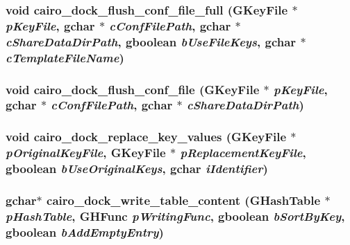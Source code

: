\subsubsection{\setlength{\rightskip}{0pt plus 5cm}void cairo\_\-dock\_\-flush\_\-conf\_\-file\_\-full (GKeyFile $\ast$ {\em pKeyFile}, gchar $\ast$ {\em cConfFilePath}, gchar $\ast$ {\em cShareDataDirPath}, gboolean {\em bUseFileKeys}, gchar $\ast$ {\em cTemplateFileName})}\label{cairo-dock-keyfile-manager_8h_ffa76b0ccbb587026cb43fd587a809bb}


\subsubsection{\setlength{\rightskip}{0pt plus 5cm}void cairo\_\-dock\_\-flush\_\-conf\_\-file (GKeyFile $\ast$ {\em pKeyFile}, gchar $\ast$ {\em cConfFilePath}, gchar $\ast$ {\em cShareDataDirPath})}\label{cairo-dock-keyfile-manager_8h_2b4bf01e0aa439539becbc63a71ae0e5}


\subsubsection{\setlength{\rightskip}{0pt plus 5cm}void cairo\_\-dock\_\-replace\_\-key\_\-values (GKeyFile $\ast$ {\em pOriginalKeyFile}, GKeyFile $\ast$ {\em pReplacementKeyFile}, gboolean {\em bUseOriginalKeys}, gchar {\em iIdentifier})}\label{cairo-dock-keyfile-manager_8h_d91342448d377a7b039a85573a6ffce8}


\subsubsection{\setlength{\rightskip}{0pt plus 5cm}gchar$\ast$ cairo\_\-dock\_\-write\_\-table\_\-content (GHashTable $\ast$ {\em pHashTable}, GHFunc {\em pWritingFunc}, gboolean {\em bSortByKey}, gboolean {\em bAddEmptyEntry})}\label{cairo-dock-keyfile-manager_8h_f70648e61010e9cfe47fa530c0e52961}


